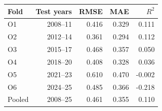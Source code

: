 \begin{tabular}{lrrrr}
\toprule
Fold & Test years & RMSE & MAE & $R^2$ \\
\midrule
O1 & 2008--11 & 0.416 & 0.329 & 0.111 \\
O2 & 2012--14 & 0.361 & 0.294 & 0.112 \\
O3 & 2015--17 & 0.468 & 0.357 & 0.050 \\
O4 & 2018--20 & 0.408 & 0.328 & 0.036 \\
O5 & 2021--23 & 0.610 & 0.470 & -0.002 \\
O6 & 2024--25 & 0.485 & 0.366 & -0.218 \\
Pooled & 2008--25 & 0.461 & 0.355 & 0.110 \\
\bottomrule
\end{tabular}
